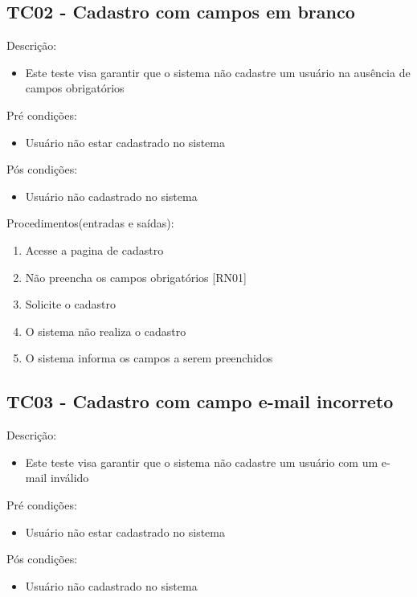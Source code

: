 \begin{apendicesenv}
\subsection{TC02 - Cadastro com campos em branco}


Descrição:
\begin{itemize}
  \item{Este teste visa garantir que o sistema não cadastre um usuário na ausência de campos obrigatórios}
\end{itemize}


Pré condições:
\begin{itemize}
  \item{Usuário não estar cadastrado no sistema}
\end{itemize}


Pós condições:
\begin{itemize}
  \item{Usuário não cadastrado no sistema}
\end{itemize}

Procedimentos(entradas e saídas):
\begin{enumerate}
  \item{Acesse a pagina de cadastro}
  \item{Não preencha os campos obrigatórios [RN01]}
  \item{Solicite o cadastro}
  \item{O sistema não realiza o cadastro}
  \item{O sistema informa os campos a serem preenchidos}
\end{enumerate}




\subsection{TC03 - Cadastro com campo e-mail incorreto}


Descrição:
\begin{itemize}
  \item{Este teste visa garantir que o sistema não cadastre um usuário com um e-mail inválido}
\end{itemize}


Pré condições:
\begin{itemize}
  \item{Usuário não estar cadastrado no sistema}
\end{itemize}


Pós condições:
\begin{itemize}
  \item{Usuário não cadastrado no sistema}
\end{itemize}


\end{apendicesenv}
